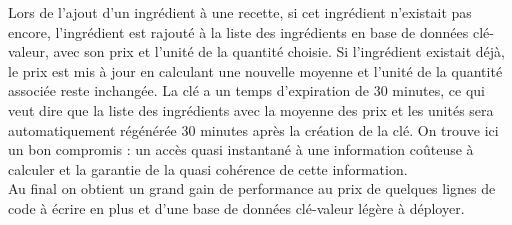 			Lors de l'ajout d'un ingrédient à une recette, si cet ingrédient n'existait pas encore, l'ingrédient est rajouté à la liste des ingrédients en base de données clé-valeur, avec son prix et l'unité de la quantité choisie. Si l'ingrédient existait déjà, le prix est mis à jour en calculant une nouvelle moyenne et l'unité de la quantité associée reste inchangée. La clé a un temps d'expiration de 30 minutes, ce qui veut dire que la liste des ingrédients avec la moyenne des prix et les unités sera automatiquement régénérée 30 minutes après la création de la clé. On trouve ici un bon compromis : un accès quasi instantané à une information coûteuse à calculer et la garantie de la quasi cohérence de cette information.\\

			Au final on obtient un grand gain de performance au prix de quelques lignes de code à écrire en plus et d'une base de données clé-valeur légère à déployer.
